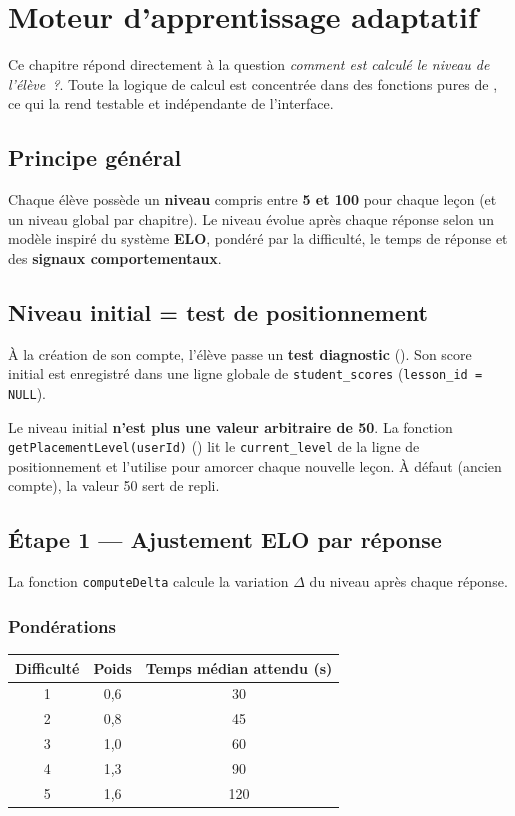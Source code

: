 \chapter{Moteur d'apprentissage adaptatif}
\label{chap:adaptatif}

Ce chapitre répond directement à la question \emph{\og comment est calculé le
niveau de l'élève~?\fg{}}. Toute la logique de calcul est concentrée dans des
fonctions pures de , ce qui la rend testable
et indépendante de l'interface.

\section{Principe général}
Chaque élève possède un \textbf{niveau} compris entre \textbf{5 et 100} pour
chaque leçon (et un niveau global par chapitre). Le niveau évolue après chaque
réponse selon un modèle inspiré du système \textbf{ELO}, pondéré par la
difficulté, le temps de réponse et des \textbf{signaux comportementaux}.

\section{Niveau initial = test de positionnement}
À la création de son compte, l'élève passe un \textbf{test diagnostic}
(). Son score initial est enregistré
dans une ligne globale de \texttt{student\_scores} (\texttt{lesson\_id = NULL}).

\begin{infobox}
Le niveau initial \textbf{n'est plus une valeur arbitraire de 50}. La fonction
\texttt{getPlacementLevel(userId)} () lit le
\texttt{current\_level} de la ligne de positionnement et l'utilise pour amorcer
chaque nouvelle leçon. À défaut (ancien compte), la valeur 50 sert de repli.
\end{infobox}

\section{Étape 1 --- Ajustement ELO par réponse}
La fonction \texttt{computeDelta} calcule la variation $\Delta$ du niveau après
chaque réponse.

\subsection{Pondérations}
\begin{center}
\begin{tabular}{ccc}
\toprule
\textbf{Difficulté} & \textbf{Poids} & \textbf{Temps médian attendu (s)} \\
\midrule
1 & 0,6 & 30 \\
2 & 0,8 & 45 \\
3 & 1,0 & 60 \\
4 & 1,3 & 90 \\
5 & 1,6 & 120 \\
\bottomrule
\end{tabular}
\end{center}

